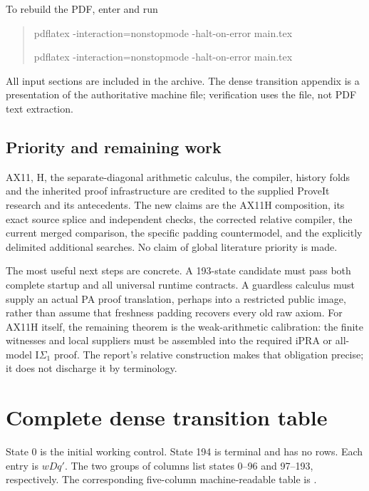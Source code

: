 \documentclass[11pt,a4paper]{article}
\begin{document}
To rebuild the PDF, enter  and run
\begin{quote}\small\ttfamily
pdflatex -interaction=nonstopmode -halt-on-error main.tex\par
pdflatex -interaction=nonstopmode -halt-on-error main.tex
\end{quote}
All input sections are included in the archive. The dense transition
appendix is a presentation of the authoritative machine file; verification
uses the file, not PDF text extraction.

\subsection{Priority and remaining work}

AX11, H, the separate-diagonal arithmetic calculus, the compiler,
history folds and the inherited proof infrastructure are credited to
the supplied ProveIt research and its antecedents. The new claims are
the AX11H composition, its exact source splice and independent checks,
the corrected relative compiler, the current merged comparison, the
specific padding countermodel, and the explicitly delimited additional
searches. No claim of global literature priority is made.

The most useful next steps are concrete. A 193-state candidate must pass
both complete startup and all universal runtime contracts. A guardless
calculus must supply an actual PA proof translation, perhaps into a
restricted public image, rather than assume that freshness padding
recovers every old raw axiom. For AX11H itself, the remaining theorem is
the weak-arithmetic calibration: the finite witnesses and local suppliers
must be assembled into the required iPRA or all-model I$\Sigma_1$ proof.
The report's relative construction makes that obligation precise; it
does not discharge it by terminology.

\clearpage
\appendix


\section{Complete dense transition table}
\label{app:table}

State 0 is the initial working control. State 194 is terminal and has no
rows. Each entry is $wDq'$. The two groups of columns list states 0--96
and 97--193, respectively. The corresponding five-column machine-readable
table is .

\end{document}
